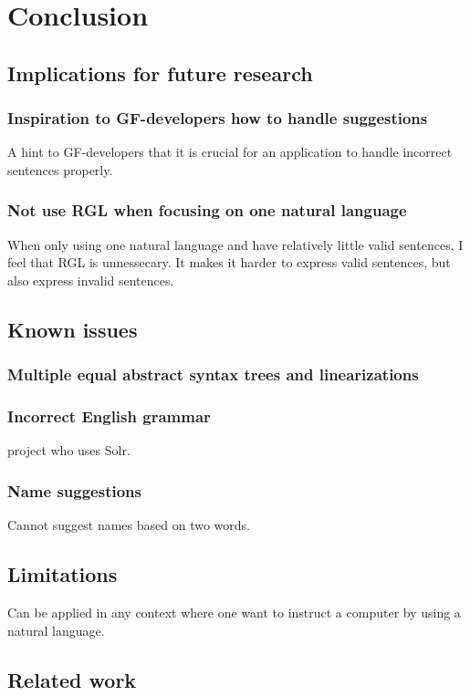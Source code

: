 \chapter{Conclusion}\label{ch:conclusion}
\section{Implications for future research}
\subsection{Inspiration to GF-developers how to handle suggestions}
A hint to GF-developers that it is crucial for an application to handle incorrect sentences properly.
\subsection{Not use RGL when focusing on one natural language}
When only using one natural language and have relatively little valid sentences, I feel that RGL is unnessecary. It makes it harder to express valid sentences, but also express invalid sentences.

\section{Known issues}
\subsection{Multiple equal abstract syntax trees and linearizations}
\subsection{Incorrect English grammar}
project who uses Solr.
\subsection{Name suggestions}
Cannot suggest names based on two words.

\section{Limitations}
Can be applied in any context where one want to instruct a computer by using a natural language.
\section{Related work}
